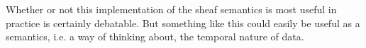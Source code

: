 \documentclass[../main/CT4S-EN-RU]{subfiles}
\begin{document}
\begin{exampleRUS}
\end{exampleRUS}

\begin{blockENG}
Whether or not this implementation of the sheaf semantics is most useful in practice is certainly debatable. But something like this could easily be useful as a semantics, i.e. a way of thinking about, the temporal nature of data.
\end{blockENG}

\begin{blockRUS}
\end{blockRUS}
\end{document}
